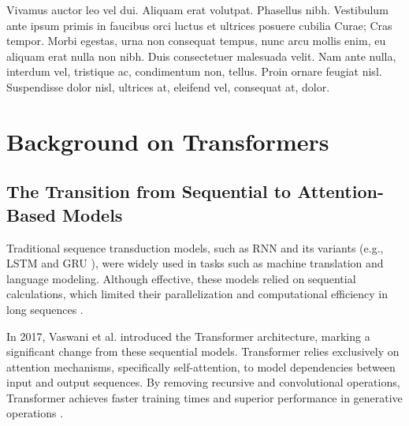 \cleardoublepage
\label{chap:back}

Vivamus auctor leo vel dui. Aliquam erat volutpat. Phasellus nibh. Vestibulum ante ipsum primis in faucibus orci luctus et ultrices posuere cubilia Curae; Cras tempor. Morbi egestas, urna non consequat tempus, nunc arcu mollis enim, eu aliquam erat nulla non nibh. Duis consectetuer malesuada velit. Nam ante nulla, interdum vel, tristique ac, condimentum non, tellus. Proin ornare feugiat nisl. Suspendisse dolor nisl, ultrices at, eleifend vel, consequat at, dolor.

\section{Background on Transformers} \subsection{The Transition from Sequential to Attention-Based Models}  
Traditional sequence transduction models, such as \ac{RNN} and its variants (e.g., \ac{LSTM} \cite{hochreiter1997lstm} and \ac{GRU} \cite{cho2014gru}), were widely used in tasks such as machine translation and language modeling. Although effective, these models relied on sequential calculations, which limited their parallelization and computational efficiency in long sequences \cite{vaswani2017attention}.

In 2017, Vaswani et al. introduced the Transformer architecture, marking a significant change from these sequential models. Transformer relies exclusively on attention mechanisms, specifically self-attention, to model dependencies between input and output sequences. By removing recursive and convolutional operations, Transformer achieves faster training times and superior performance in generative operations \cite{vaswani2017attention}.

